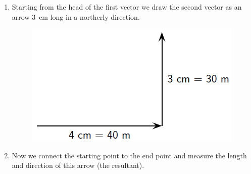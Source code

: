{\begin{mdframed}[linewidth=4, leftmargin=40, rightmargin=40]
\begin{exercise}
\begin{enumerate}[noitemsep, label=\textbf{Step} \textbf{\arabic*}. ]
\begin{figure}[H]
 \end{figure}   

    \addtocounter{footnote}{-0}
    
          \par 
          \item  
          \label{m38815*id189754}Starting from the head of the first vector we draw the second vector as an arrow 3~cm long in a northerly direction.\par 
          \label{m38815*id189760}
            
    \setcounter{subfigure}{0}


	\begin{figure}[H] %
    \begin{center}
    \label{m38815*id189763!!!underscore!!!media}\label{m38815*id189763!!!underscore!!!printimage}\includegraphics{col11305.imgs/m38815_PG11C1_047.png} %
        
      \vspace{2pt}
    \vspace{.1in}
    
    \end{center}

 \end{figure}   

    \addtocounter{footnote}{-0}
    
          \par 
          \item  
          \label{m38815*id189774}Now we connect the starting point to the end point and
measure the length and direction of this arrow (the resultant).\par 
          \label{m38815*id189778}
            
    \setcounter{subfigure}{0}



\end{enumerate}
\end{exercise}
\end{mdframed}}

